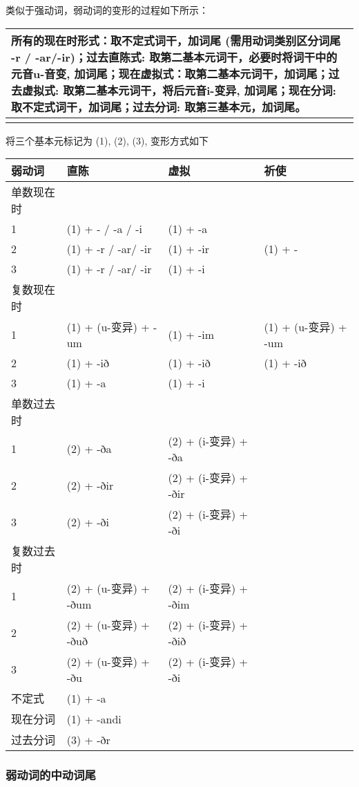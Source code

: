 类似于强动词，弱动词的变形的过程如下所示：

\begin{longtable}{l}
\toprule
所有的现在时形式：取不定式词干，加词尾 (需用动词类别区分词尾 -r / -ar/-ir)；过去直陈式: 取第二基本元词干，必要时将词干中的元音u-音变, 加词尾；现在虚拟式：取第二基本元词干，加词尾；过去虚拟式: 取第二基本元词干，将后元音i-变异, 加词尾；现在分词: 取不定式词干，加词尾；过去分词: 取第三基本元，加词尾。 \\
\midrule
\endhead
\bottomrule
\endfoot
\end{longtable}

将三个基本元标记为 (1), (2), (3), 变形方式如下

\begin{longtable}{llll}
\toprule
弱动词 & 直陈 & 虚拟 & 祈使 \\
\midrule
\endhead
\bottomrule
\endfoot
单数现在时 & & & \\
1 & (1) + - / -a / -i & (1) + -a & \\
2 & (1) + -r / -ar/ -ir & (1) + -ir & (1) + - \\
3 & (1) + -r / -ar/ -ir & (1) + -i & \\
复数现在时 & & & \\
1 & (1) + (u-变异) + -um & (1) + -im & (1) + (u-变异) + -um \\
2 & (1) + -ið & (1) + -ið & (1) + -ið \\
3 & (1) + -a & (1) + -i & \\
单数过去时 & & & \\
1 & (2) + -ða & (2) + (i-变异) + -ða & \\
2 & (2) + -ðir & (2) + (i-变异) + -ðir & \\
3 & (2) + -ði & (2) + (i-变异) + -ði & \\
复数过去时 & & & \\
1 & (2) + (u-变异) + -ðum & (2) + (i-变异) + -ðim & \\
2 & (2) + (u-变异) + -ðuð & (2) + (i-变异) + -ðið & \\
3 & (2) + (u-变异) + -ðu & (2) + (i-变异) + -ði & \\
不定式 & (1) + -a & & \\
现在分词 & (1) + -andi & & \\
过去分词 & (3) + -ðr & & \\
\end{longtable}

\subsubsection{弱动词的中动词尾}\label{ux5f31ux52a8ux8bcdux7684ux4e2dux52a8ux8bcdux5c3e}

